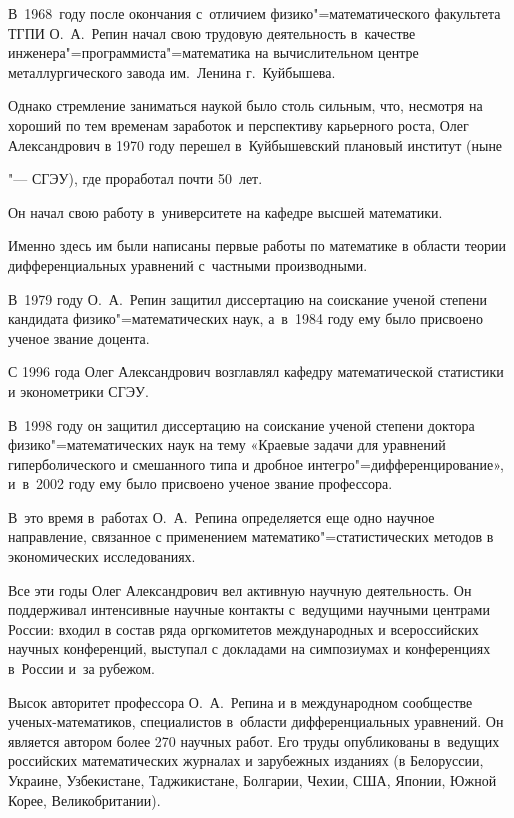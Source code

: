В~1968~году после окончания с~отличием физико"=математического факультета \mbox{ТГПИ}  О.~А.~Репин начал свою трудовую деятельность в~качестве инженера"=программиста"=математика на вычислительном центре металлургического завода им.~Ленина г.~Куйбышева. 



Однако стремление заниматься наукой было столь сильным, что, несмотря на хороший по тем временам заработок и перспективу карьерного роста, Олег Александрович в 1970 году перешел в~Куйбышевский плановый институт (ныне 

 "--- СГЭУ), где проработал почти 50~лет. 

Он начал свою работу в~университете на кафедре высшей математики.

Именно здесь им были написаны первые работы по математике в области теории дифференциальных уравнений с~частными производными. 

В~1979 году О.~А.~Репин  защитил диссертацию на соискание ученой степени кандидата физико"=математических наук, а~в~1984 году ему было присвоено ученое звание доцента. 



С 1996 года Олег Александрович возглавлял кафедру математической статистики и эконометрики СГЭУ. 

В~1998 году он защитил диссертацию на соискание ученой степени доктора физико"=математических наук на тему «Краевые задачи для уравнений гиперболического и смешанного типа и дробное интегро"=дифференцирование», и~в~2002 году ему было присвоено ученое звание профессора. 

В~это время в~работах О.~А.~Репина определяется еще одно научное направление, связанное с применением математико"=статистических методов в экономических исследованиях.



Все эти годы Олег Александрович вел активную научную деятельность. Он поддерживал интенсивные научные контакты с~ведущими научными центрами России: входил в состав ряда оргкомитетов международных и всероссийских научных конференций, выступал с докладами на симпозиумах и конференциях в~России и~за рубежом. 



Высок авторитет профессора О.~А.~Репина и в международном сообществе ученых-математиков, специалистов в~области дифференциальных уравнений. Он является автором более 270 научных работ. Его труды опубликованы в~ведущих российских математических журналах и зарубежных изданиях (в Белоруссии, Украине, Узбекистане, Таджикистане, Болгарии, Чехии, США, Японии, Южной Корее, Великобритании). 



